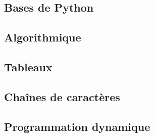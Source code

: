 \documentclass[10pt,fleqn]{article} %
\newcommand{\repStyle}{../../Style}
\begin{document}
\def\xxcompetences{}
\def\xxfigures{}

\graphicspath{{\repStyle/png/}}

\setlength{\columnseprule}{.1pt}




\pagestyle{fancy}
\thispagestyle{plain}


\proffalse

\begin{multicols}{2}
\section{Bases de Python}

\end{multicols}
\newpage

\begin{multicols}{2}
\section{Algorithmique}

\end{multicols}
\newpage

\begin{multicols}{2}
\section{Tableaux}

\end{multicols}
\newpage

\begin{multicols}{2}
\section{Chaînes de caractères}

\end{multicols}
\newpage

\begin{multicols}{2}
\section{Programmation dynamique}

\end{multicols}
\newpage
\end{document}
